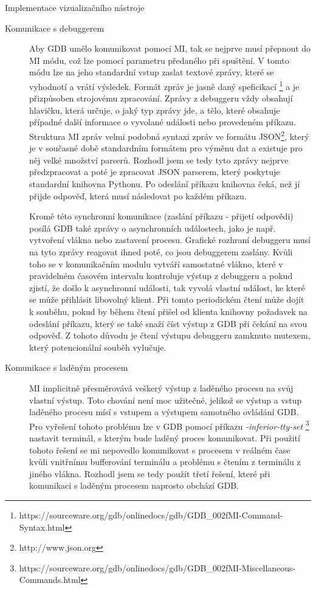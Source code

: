 \documentclass[bc,male,python,dept460]{diploma}						%
\begin{document}
\begin{section}{Implementace vizualizačního nástroje}
		\begin{description}
			\item[Komunikace s debuggerem]
			Aby GDB umělo komunikovat pomocí MI, tak se nejprve musí přepnout do MI módu, což lze pomocí parametru předaného při spuštění. V tomto módu
			lze na jeho standardní vstup zaslat textové zprávy, které se vyhodnotí a vrátí výsledek. Formát zpráv je jasně daný speficikací
			\footnote{https://sourceware.org/gdb/onlinedocs/gdb/GDB\_002fMI-Command-Syntax.html} a je přizpůsoben strojovému zpracování. Zprávy z debuggeru
			vždy obsahují hlavičku, která určuje, o jaký typ zprávy jde, a tělo, které obsahuje případné další informace o vyvolané události nebo
			provedeném příkazu. Struktura MI zpráv velmi podobná syntaxi zpráv ve formátu JSON\footnote{http://www.json.org}, který je v současné době standardním
			formátem pro výměnu dat a existuje pro něj velké množství parserů.
			Rozhodl jsem se tedy tyto zprávy nejprve předzpracovat a poté je zpracovat JSON parserem, který poskytuje
			standardní knihovna Pythonu. %
			Po odeslání příkazu knihovna čeká, než jí přijde odpověď, která musí následovat po každém příkazu.
			
			\par Kromě této synchronní komunikace (zaslání příkazu - přijetí odpovědi) posílá GDB také zprávy o asynchronních událostech, jako je např.
			vytvoření vlákna nebo zastavení procesu. Grafické rozhraní debuggeru musí na tyto zprávy reagovat ihned poté, co jsou debuggerem zaslány.
			Kvůli toho se v komunikačním modulu vytváří samostatné vlákno, které v pravidelném časovém intervalu kontroluje výstup z debuggeru a pokud zjistí, že došlo
			k asynchronní události, tak vyvolá vlastní událost, ke které se může přihlásit libovolný klient. Při tomto periodickém čtení může dojít k souběhu, pokud
			by během čtení přišel od klienta knihovny požadavek na odeslání příkazu, který se také snaží číst výstup z GDB při čekání na svou odpověď.
			Z tohoto důvodu je čtení výstupu debuggeru zamknuto mutexem, který potencionální souběh vylučuje.
			
			\item[Komunikace s laděným procesem]
			MI implicitně přesměrovává veškerý výstup z laděného procesu na svůj vlastní výstup. Toto chování není moc užitečné, jelikož se výstup a vstup laděného
			procesu mísí s vstupem a výstupem samotného ovládání GDB. Pro vyřešení tohoto problému lze v GDB pomocí příkazu \textit{-inferior-tty-set}
			\footnote{https://sourceware.org/gdb/onlinedocs/gdb/GDB\_002fMI-Miscellaneous-Commands.html} nastavit terminál, s kterým bude laděný proces komunikovat.
			Při použití tohoto řešení se mi nepovedlo komunikovat s procesem v reálném čase kvůli vnitřnímu bufferování terminálu a problému s čtením z terminálu z
			jiného vlákna. %
			Rozhodl jsem se tedy použít třetí řešení, které při komunikaci s laděným procesem naprosto obchází GDB.
			

\end{description}
\end{section}
\end{document}
